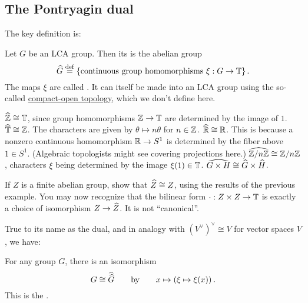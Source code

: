 \subsection{The Pontryagin dual}
The key definition is:
\begin{definition}
	Let $G$ be an LCA group.
	Then its  is the abelian group
	\[ \widehat G \overset{\mathrm{def}}{=} \left\{ \text{continuous group homomorphisms }
			\xi : G \to \mathbb T \right\}. \]
	The maps $\xi$ are called .
	It can itself be made into an LCA group
	using the so-called
	\href{https://en.wikipedia.org/wiki/Compact-open_topology}{compact-open topology},
	which we don't define here.
\end{definition}
\begin{example}
	\listhack
	\begin{itemize}
		\ii $\widehat{\mathbb Z} \cong \mathbb T$,
		since group homomorphisms $\mathbb Z \to \mathbb T$ are determined by the image of $1$.
		\ii $\widehat{\mathbb T} \cong \mathbb Z$.
		The characters are given by $\theta \mapsto n\theta$ for $n \in \mathbb Z$.
		\ii $\widehat{\mathbb R} \cong \mathbb R$.
		This is because a nonzero continuous homomorphism
		$\mathbb R \to S^1$ is determined by the fiber above $1 \in S^1$.
		(Algebraic topologists might see covering projections here.)
		\ii $\widehat{\mathbb Z/n\mathbb Z} \cong \mathbb Z/n\mathbb Z$,
		characters $\xi$ being determined by the image $\xi(1) \in \mathbb T$.
		\ii $\widehat{G \times H} \cong \widehat G \times \widehat H$.
	\end{itemize}
\end{example}
\begin{exercise}
	If $Z$ is a finite abelian group, show that $\widehat Z \cong Z$,
	using the results of the previous example.
	You may now recognize that the bilinear form
	$\cdot : Z \times Z \to \mathbb T$
	is exactly a choice of isomorphism $Z \to \widehat Z$.
	It is not ``canonical''.
\end{exercise}


True to its name as the dual,
and in analogy with $(V^\vee)^\vee \cong V$ for vector spaces $V$, we have:
\begin{theorem}
	For any group $G$, there is an isomorphism
	\[ G \cong \widehat{\widehat G} \qquad \text{by} \qquad
		x \mapsto \left( \xi \mapsto \xi(x) \right). \]
	This is the .
\end{theorem}

